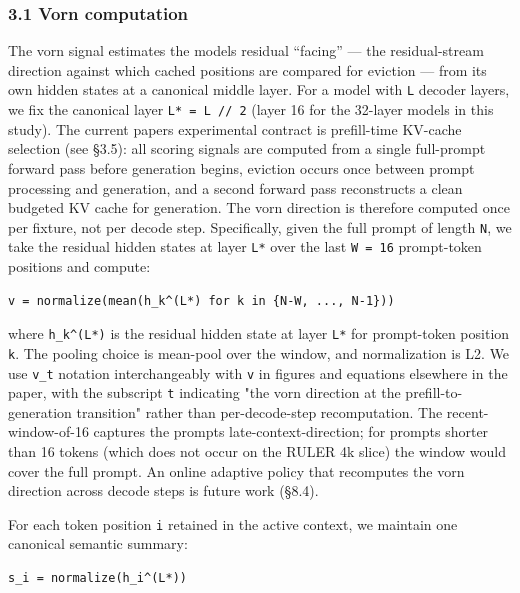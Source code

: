 \documentclass[
]{article}
\begin{document}
\subsubsection{3.1 Vorn computation}\label{31-vorn-computation}

The vorn signal estimates the model\textquotesingle s residual
``facing'' --- the residual-stream direction against which cached
positions are compared for eviction --- from its own hidden states at a
canonical middle layer.
For a model with \texttt{L} decoder layers, we fix the canonical layer
\texttt{L*\ =\ L\ //\ 2} (layer 16 for the 32-layer models in this
study). The current paper\textquotesingle s experimental contract is
prefill-time KV-cache selection (see §3.5): all scoring signals are
computed from a single full-prompt forward pass before generation
begins, eviction occurs once between prompt processing and generation,
and a second forward pass reconstructs a clean budgeted KV cache for
generation. The vorn direction is therefore computed once per fixture,
not per decode step. Specifically, given the full prompt of length
\texttt{N}, we take the residual hidden states at layer \texttt{L*} over
the last \texttt{W\ =\ 16} prompt-token positions and compute:

\begin{verbatim}
v = normalize(mean(h_k^(L*) for k in {N-W, ..., N-1}))
\end{verbatim}

where \texttt{h\_k\^{}(L*)} is the residual hidden state at layer
\texttt{L*} for prompt-token position \texttt{k}. The pooling choice is
mean-pool over the window, and normalization is L2. We use \texttt{v\_t}
notation interchangeably with \texttt{v} in figures and equations
elsewhere in the paper, with the subscript \texttt{t} indicating "the
vorn direction at the prefill-to-generation transition" rather than
per-decode-step recomputation. The recent-window-of-16 captures the
prompt\textquotesingle s late-context-direction; for prompts shorter
than 16 tokens (which does not occur on the RULER 4k slice) the window
would cover the full prompt. An online adaptive policy that recomputes
the vorn direction across decode steps is future work (§8.4).

For each token position \texttt{i} retained in the active context, we
maintain one canonical semantic summary:

\begin{verbatim}
s_i = normalize(h_i^(L*))
\end{verbatim}
\end{document}
